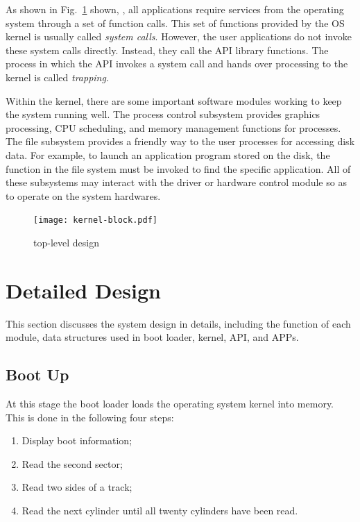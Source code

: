 \documentclass{swfcthesis}
\begin{document}
As shown in Fig.~\ref{fig:top-level} shown, , all applications
require services from the
operating system through a set of function calls. This set of functions provided by the OS
kernel is usually called \emph{system calls}. However, the user applications do not invoke
these system calls directly. Instead, they call the API library functions. The process in
which the API invokes a system call and hands over processing to the kernel is called
\emph{trapping}.

Within the kernel, there are some important software modules working to keep the system
running well. The process control subsystem provides graphics processing, CPU scheduling,
and memory management functions for processes.  The file
subsystem provides a friendly way to the user processes for accessing disk data. For
example, to launch an application program stored on the disk, the function in the file
system must be invoked to find the specific application. All of these subsystems may
interact with the driver or hardware control module so as to operate on the system
hardwares.

\begin{figure}%
  \centering
  \texttt{[image: kernel-block.pdf]}
  \caption{top-level design}
  \label{fig:top-level}
\end{figure}


\section{Detailed Design}
\label{sec:detailed-design}

This section discusses the system design in details, including the function of each
module, data structures used in boot loader, kernel, API, and APPs.

\subsection{Boot Up}
\label{sec:boot-up}

At this stage the boot loader loads the operating system kernel into memory. This is done
in the following four steps:
\begin{enumerate}
\item Display boot information;
\item Read the second sector;
\item Read two sides of a track;
\item Read the next cylinder until all twenty cylinders have been read.
\end{enumerate}
\end{document}
